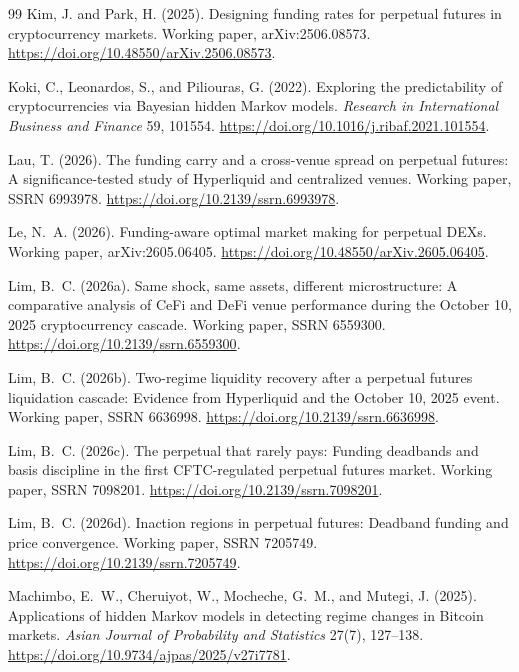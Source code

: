 \documentclass[10pt,a4paper]{article}
\begin{document}
\begin{thebibliography}{99}
Kim, J. and Park, H. (2025).
\newblock Designing funding rates for perpetual futures in cryptocurrency markets.
\newblock Working paper, arXiv:2506.08573.
\newblock \url{https://doi.org/10.48550/arXiv.2506.08573}.

Koki, C., Leonardos, S., and Piliouras, G. (2022).
\newblock Exploring the predictability of cryptocurrencies via Bayesian hidden Markov models.
\newblock \textit{Research in International Business and Finance} 59, 101554.
\newblock \url{https://doi.org/10.1016/j.ribaf.2021.101554}.

Lau, T. (2026).
\newblock The funding carry and a cross-venue spread on perpetual futures: A significance-tested study of Hyperliquid and centralized venues.
\newblock Working paper, SSRN 6993978.
\newblock \url{https://doi.org/10.2139/ssrn.6993978}.

Le, N.~A. (2026).
\newblock Funding-aware optimal market making for perpetual DEXs.
\newblock Working paper, arXiv:2605.06405.
\newblock \url{https://doi.org/10.48550/arXiv.2605.06405}.

Lim, B.~C. (2026a).
\newblock Same shock, same assets, different microstructure: A comparative analysis of CeFi and DeFi venue performance during the October 10, 2025 cryptocurrency cascade.
\newblock Working paper, SSRN 6559300.
\newblock \url{https://doi.org/10.2139/ssrn.6559300}.

Lim, B.~C. (2026b).
\newblock Two-regime liquidity recovery after a perpetual futures liquidation cascade: Evidence from Hyperliquid and the October 10, 2025 event.
\newblock Working paper, SSRN 6636998.
\newblock \url{https://doi.org/10.2139/ssrn.6636998}.

Lim, B.~C. (2026c).
\newblock The perpetual that rarely pays: Funding deadbands and basis discipline in the first CFTC-regulated perpetual futures market.
\newblock Working paper, SSRN 7098201.
\newblock \url{https://doi.org/10.2139/ssrn.7098201}.

Lim, B.~C. (2026d).
\newblock Inaction regions in perpetual futures: Deadband funding and price convergence.
\newblock Working paper, SSRN 7205749.
\newblock \url{https://doi.org/10.2139/ssrn.7205749}.

Machimbo, E.~W., Cheruiyot, W., Mocheche, G.~M., and Mutegi, J. (2025).
\newblock Applications of hidden Markov models in detecting regime changes in Bitcoin markets.
\newblock \textit{Asian Journal of Probability and Statistics} 27(7), 127--138.
\newblock \url{https://doi.org/10.9734/ajpas/2025/v27i7781}.


\end{thebibliography}
\end{document}
